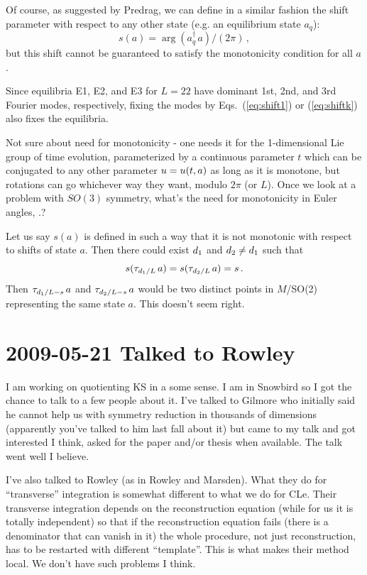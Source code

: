 Of course, as suggested by Predrag, we can define in a similar
fashion the shift parameter with respect to any other
state (e.g. an equilibrium state $a_q$):
\[ s(a) = \arg(a_q^\dagger\, a)/(2\pi)\,, \]
but this shift cannot be guaranteed to satisfy the
monotonicity condition for all $a$.

Since equilibria E1, E2, and E3 for $L = 22$ have dominant
1st, 2nd, and 3rd Fourier modes, respectively, fixing the modes by
Eqs.~(\ref{eq:shift1}) or (\ref{eq:shiftk}) also fixes the equilibria.


\medskip{}
\medskip{}
Not sure about need for monotonicity - one needs it for the 1-dimensional
Lie group of time evolution, parameterized by a continuous parameter $t$
which can be conjugated to any other parameter $u = u(t,a)$ as long
as it is monotone, but rotations can go whichever way they want, modulo
$2\pi$ (or $L$). Once we look at a problem with $SO(3)$ symmetry, what's the
need for monotonicity in Euler angles, \etc.?

\medskip{}
Let us say $s(a)$ is defined in such a way that it is not monotonic with respect to
shifts of state $a$.  Then there could exist $d_1$ and $d_2 \neq d_1$ such that
\[ s(\tau_{d_1/L}\,a) = s(\tau_{d_2/L}\,a) = s\,. \]
Then $\tau_{d_1/L - s}\,a$ and $\tau_{d_2/L - s}\,a$ would be two distinct points
in $M$/SO(2) representing the same state $a$.  This doesn't seem right.

\section{2009-05-21 Talked to Rowley}

I am working on quotienting KS in a some sense. I am in
Snowbird so I got the chance to talk to a few people about
it. I've talked to Gilmore who initially said he cannot help
us with symmetry reduction in thousands of dimensions
(apparently you've talked to him last fall about it) but came
to my talk and got interested I think, asked for the paper
and/or thesis when available. The talk went well I believe.

I've also talked to Rowley (as in Rowley and Marsden). What
they do for ``transverse'' integration is somewhat different to
what we do for CLe. Their transverse integration depends on
the reconstruction equation (while for us it is totally
independent) so that if the reconstruction equation fails
(there is a denominator that can vanish in it) the whole
procedure, not just reconstruction, has to be restarted with
different ``template''. This is what makes their method local.
We don't have such problems I think.

